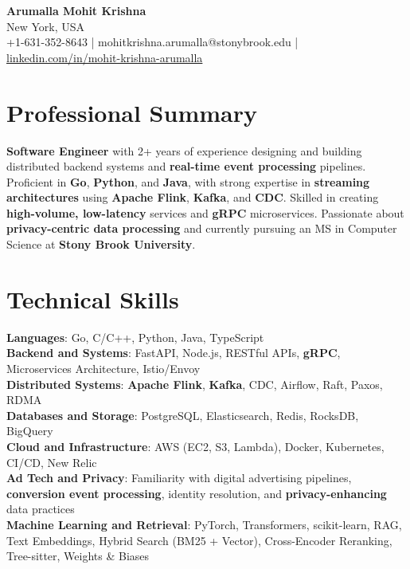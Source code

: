 \documentclass[letterpaper,11pt]{article}
\begin{document}
\begin{center}
  {\Large \textbf{Arumalla Mohit Krishna}} \\
  New York, USA \\
  +1-631-352-8643 \enspace | \enspace mohitkrishna.arumalla@stonybrook.edu \enspace | \enspace \href{https://www.linkedin.com/in/mohit-krishna-arumalla}{linkedin.com/in/mohit-krishna-arumalla}
\end{center}

\section{Professional Summary}
  \begin{itemize}[leftmargin=0.15in, label={}]
    \small{\item{
     \textbf{Software Engineer} with 2+ years of experience designing and building distributed backend systems and \textbf{real-time event processing} pipelines. Proficient in \textbf{Go}, \textbf{Python}, and \textbf{Java}, with strong expertise in \textbf{streaming architectures} using \textbf{Apache Flink}, \textbf{Kafka}, and \textbf{CDC}. Skilled in creating \textbf{high-volume, low-latency} services and \textbf{gRPC} microservices. Passionate about \textbf{privacy-centric data processing} and currently pursuing an MS in Computer Science at \textbf{Stony Brook University}.
    }}
  \end{itemize}
\vspace{-16pt}

\section{Technical Skills}
 \begin{itemize}[leftmargin=0.15in, label={}]
    \small{\item{
     \textbf{Languages}: Go, C/C++, Python, Java, TypeScript \\
     \textbf{Backend and Systems}: FastAPI, Node.js, RESTful APIs, \textbf{gRPC}, Microservices Architecture, Istio/Envoy \\
     \textbf{Distributed Systems}: \textbf{Apache Flink}, \textbf{Kafka}, CDC, Airflow, Raft, Paxos, RDMA \\
     \textbf{Databases and Storage}: PostgreSQL, Elasticsearch, Redis, RocksDB, BigQuery \\
     \textbf{Cloud and Infrastructure}: AWS (EC2, S3, Lambda), Docker, Kubernetes, CI/CD, New Relic \\
     \textbf{Ad Tech and Privacy}: Familiarity with digital advertising pipelines, \textbf{conversion event processing}, identity resolution, and \textbf{privacy-enhancing} data practices \\
     \textbf{Machine Learning and Retrieval}: PyTorch, Transformers, scikit-learn, RAG, Text Embeddings, Hybrid Search (BM25 + Vector), Cross-Encoder Reranking, Tree-sitter, Weights \& Biases
    }}
 \end{itemize}
\vspace{-16pt}
\end{document}
